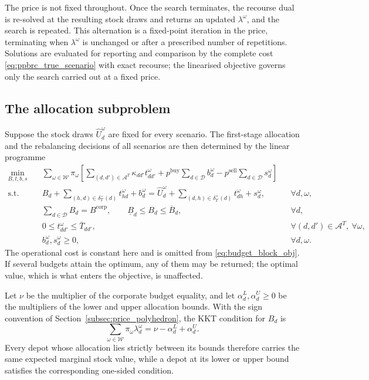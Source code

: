 \documentclass[authoryear,final,3p,times]{elsarticle}
\theoremstyle{definition}
\theoremstyle{plain}
\begin{document}
The price is not fixed throughout. Once the search terminates, the recourse
dual is re-solved at the resulting stock draws and returns an updated
$\lambda^\omega$, and the search is repeated. This alternation is a
fixed-point iteration in the price, terminating when $\lambda^\omega$ is
unchanged or after a prescribed number of repetitions. Solutions are
evaluated for reporting and comparison by the complete cost
\eqref{eq:ppbrc_true_scenario} with exact recourse; the linearised objective
governs only the search carried out at a fixed price.

\subsection{The allocation subproblem}
\label{subsec:budget_recourse_block}
\label{subsec:ppbrc_properties}

Suppose the stock draws $\widehat U_d^\omega$ are fixed for every scenario. The first-stage allocation and the rebalancing decisions of all scenarios are then determined by the linear programme
\begin{align}
 \min_{B,t,b,s}\quad
 &\sum_{\omega\in\mathcal W}\pi_\omega\left[
 \sum_{(d,d')\in\mathcal A^T}\kappa_{dd'}t_{dd'}^\omega
 +p^{\mathrm{buy}}\sum_{d\in\mathcal D}b_d^\omega
 -p^{\mathrm{sell}}\sum_{d\in\mathcal D}s_d^\omega\right]
 \label{eq:budget_block_obj}\\
 \text{s.t.}\quad
 &B_d+\sum_{(h,d)\in\delta_T^-(d)}t_{hd}^\omega+b_d^\omega
 =\widehat U_d^\omega+\sum_{(d,h)\in\delta_T^+(d)}t_{dh}^\omega+s_d^\omega,
 &&\forall d,\omega,\label{eq:budget_block_balance}\\
 &\sum_{d\in\mathcal D}B_d=B^{\mathrm{corp}},\qquad
 \underline B_d\le B_d\le\overline B_d,
 &&\forall d,\label{eq:budget_block_budget}\\
 &0\le t_{dd'}^\omega\le\overline T_{dd'},
 &&\forall(d,d')\in\mathcal A^T,\ \forall\omega,\label{eq:budget_block_transfer}\\
 &b_d^\omega,s_d^\omega\ge0,
 &&\forall d,\omega.\label{eq:budget_block_domain}
\end{align}
The operational cost is constant here and is omitted from \eqref{eq:budget_block_obj}. If several budgets attain the optimum, any of them may be returned; the optimal value, which is what enters the objective, is unaffected.

Let $\nu$ be the multiplier of the corporate budget equality, and let $\alpha_d^L,\alpha_d^U\ge0$ be the multipliers of the lower and upper allocation bounds. With the sign convention of Section~\ref{subsec:price_polyhedron}, the KKT condition for $B_d$ is
\begin{equation}
 \sum_{\omega\in\mathcal W}\pi_\omega\lambda_d^\omega
 =\nu-\alpha_d^L+\alpha_d^U.
 \label{eq:expected_price_kkt}
\end{equation}
Every depot whose allocation lies strictly between its bounds therefore carries the same expected marginal stock value, while a depot at its lower or upper bound satisfies the corresponding one-sided condition.
\end{document}
